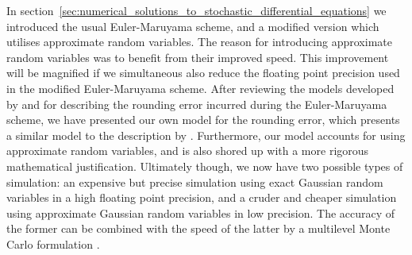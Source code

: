 \documentclass[9pt,a4paper,english]{extarticle}
\begin{document}
In section~\ref{sec:numerical_solutions_to_stochastic_differential_equations} we introduced the usual Euler-Maruyama scheme, and a modified version which utilises approximate random variables. The reason for introducing approximate random variables was to benefit from their improved speed. This improvement will be magnified if we simultaneous also reduce the floating point precision used in the modified Euler-Maruyama scheme. After reviewing the models developed by \citet{arciniega2003rounding} and \citet{omland2016mixed} for describing the rounding error incurred during the Euler-Maruyama scheme, we have presented our own model for the rounding error, which presents a similar model to the description by \citet{arciniega2003rounding}. Furthermore, our model accounts for using approximate random variables, and is also shored up with a more rigorous mathematical justification. Ultimately though, we now have two possible types of simulation: an expensive but precise simulation using exact Gaussian random variables in a high floating point precision, and a cruder and cheaper simulation using approximate Gaussian random variables in low precision. The accuracy of the former can be combined with the speed of the latter by a multilevel Monte Carlo formulation \citep{giles2008multilevel,giles2015multilevel_review}. 
\end{document}
